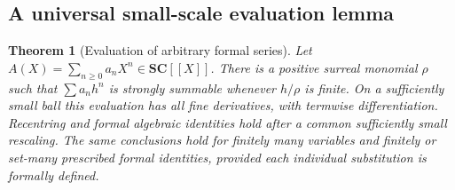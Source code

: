 \documentclass[11pt,letterpaper]{article}
\newtheorem{theorem}{Theorem}[section]
\theoremstyle{definition}
\theoremstyle{remark}
\newcommand{\SC}{\mathbf{SC}}
\numberwithin{equation}{section}
\begin{document}
\subsection{A universal small-scale evaluation lemma}
\begin{theorem}[Evaluation of arbitrary formal series]\label{thm:smallscale}
Let $A(X)=\sum_{n\ge0}a_nX^n\in\SC[[X]]$. There is a positive surreal monomial $\rho$ such that $\sum a_nh^n$ is strongly summable whenever $h/\rho$ is finite. On a sufficiently small ball this evaluation has all fine derivatives, with termwise differentiation. Recentring and formal algebraic identities hold after a common sufficiently small rescaling. The same conclusions hold for finitely many variables and finitely or set-many prescribed formal identities, provided each individual substitution is formally defined.
\end{theorem}
\end{document}
